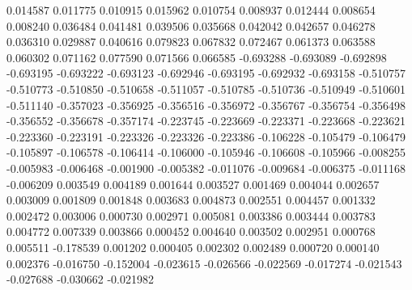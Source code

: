 0.014587
0.011775
0.010915
0.015962
0.010754
0.008937
0.012444
0.008654
0.008240
0.036484
0.041481
0.039506
0.035668
0.042042
0.042657
0.046278
0.036310
0.029887
0.040616
0.079823
0.067832
0.072467
0.061373
0.063588
0.060302
0.071162
0.077590
0.071566
0.066585
-0.693288
-0.693089
-0.692898
-0.693195
-0.693222
-0.693123
-0.692946
-0.693195
-0.692932
-0.693158
-0.510757
-0.510773
-0.510850
-0.510658
-0.511057
-0.510785
-0.510736
-0.510949
-0.510601
-0.511140
-0.357023
-0.356925
-0.356516
-0.356972
-0.356767
-0.356754
-0.356498
-0.356552
-0.356678
-0.357174
-0.223745
-0.223669
-0.223371
-0.223668
-0.223621
-0.223360
-0.223191
-0.223326
-0.223326
-0.223386
-0.106228
-0.105479
-0.106479
-0.105897
-0.106578
-0.106414
-0.106000
-0.105946
-0.106608
-0.105966
-0.008255
-0.005983
-0.006468
-0.001900
-0.005382
-0.011076
-0.009684
-0.006375
-0.011168
-0.006209
0.003549
0.004189
0.001644
0.003527
0.001469
0.004044
0.002657
0.003009
0.001809
0.001848
0.003683
0.004873
0.002551
0.004457
0.001332
0.002472
0.003006
0.000730
0.002971
0.005081
0.003386
0.003444
0.003783
0.004772
0.007339
0.003866
0.000452
0.004640
0.003502
0.002951
0.000768
0.005511
-0.178539
0.001202
0.000405
0.002302
0.002489
0.000720
0.000140
0.002376
-0.016750
-0.152004
-0.023615
-0.026566
-0.022569
-0.017274
-0.021543
-0.027688
-0.030662
-0.021982
